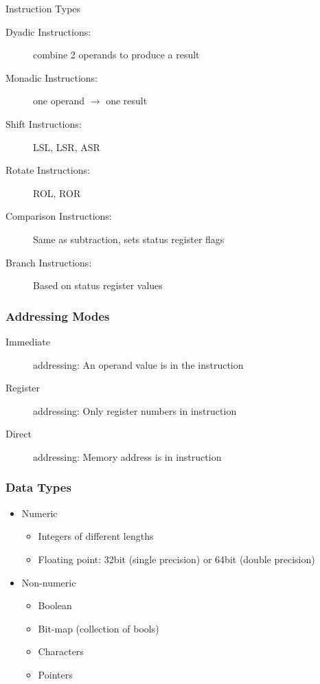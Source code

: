 \begin{note}{Instruction Types}
\begin{description}
	\item[Dyadic Instructions:] combine 2 operands to produce a result
	\item[Monadic Instructions:] one operand $\rightarrow$ one result
	\item[Shift Instructions:] LSL, LSR, ASR
	\item[Rotate Instructions:] ROL, ROR
	\item[Comparison Instructions:] Same as subtraction, sets status register flags
	\item[Branch Instructions:] Based on status register values
\end{description}	
\end{note}

\subsubsection{Addressing Modes}
\begin{description}
	\item[Immediate] addressing: An operand value is in the instruction
	\item[Register] addressing: Only register numbers in instruction
	\item[Direct] addressing: Memory address is in instruction	
\end{description}

\subsubsection{Data Types}
\begin{itemize}
	\item Numeric
	\begin{itemize}
		\item Integers of different lengths
		\item Floating point: 32bit (single precision) or 64bit (double precision)
	\end{itemize}
	\item Non-numeric
	\begin{itemize}
		\item Boolean
		\item Bit-map (collection of bools)
		\item Characters
		\item Pointers
	\end{itemize}	
\end{itemize}

